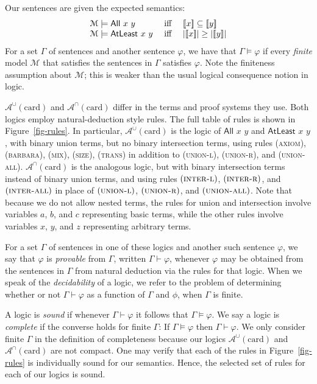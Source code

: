 \documentclass[letterpaper]{article}
\theoremstyle{definition}
\newcommand{\semantics}[1]{[\![\mbox{\em $ #1 $\/}]\!]}
\newcommand{\Model}{\mathcal{M}}
\newcommand{\proves}{\vdash}
\newcommand{\Aunion}{\mathscr{A}^{\cup}}
\newcommand{\Ainter}{\mathscr{A}^{\cap}}
\newcommand{\proverule}{\textsc}
\newcommand{\axiom}{\proverule{axiom}}
\newcommand{\barbara}{\proverule{barbara}}
\newcommand{\unionl}{\proverule{union-l}}
\newcommand{\unionr}{\proverule{union-r}}
\newcommand{\unionall}{\proverule{union-all}}
\newcommand{\interl}{\proverule{inter-l}}
\newcommand{\interr}{\proverule{inter-r}}
\newcommand{\interall}{\proverule{inter-all}}
\newcommand{\mix}{\proverule{mix}}
\newcommand{\size}{\proverule{size}}
\newcommand{\trans}{\proverule{trans}}
\newcommand{\All}[2]{\mathsf{All}\,\,#1\,\,#2}
\newcommand{\Atleast}[2]{\mathsf{AtLeast}\,\,#1\,\,#2}
\newcommand{\card}{\mathrm{card}}
\begin{document}
Our sentences are given the expected semantics:
\[
\begin{array}{lclcl}
    \Model \models \All{x}{y} & \textrm{ iff } & 
        \semantics{x} \subseteq \semantics{y}\\
    \Model \models \Atleast{x}{y} & \textrm{ iff } & 
        |\semantics{x}| \ge |\semantics{y}|
\end{array}
\] 
For a set $\Gamma$ of sentences and another sentence $\varphi$, we have that $\Gamma \vDash \varphi$ if every \textit{finite} model $\mathcal{M}$ that satisfies the sentences in $\Gamma$ satisfies $\varphi$.  Note the finiteness assumption about $\mathcal{M}$; this is weaker than the usual logical consequence notion in logic. 

$\Aunion(\card)$ and $\Ainter(\card)$ differ in the terms and proof systems they use. Both logics employ natural-deduction style rules.  The full table of rules is shown in Figure~\ref{fig-rules}.  In particular, $\Aunion(\card)$ is the logic of $\All{x}{y}$ and $\Atleast{x}{y}$, with binary union terms, but no binary intersection terms, using rules (\axiom), (\barbara), (\mix), (\size), (\trans) in addition to (\unionl), (\unionr), and (\unionall).
$\Ainter(\card)$ is the analogous logic, but with binary intersection terms instead of binary union terms, and using rules $(\interl)$, $(\interr)$, and $(\interall)$ in place of $(\unionl)$, $(\unionr)$, and $(\unionall)$. Note that because we do not allow nested terms, the rules for union and intersection involve variables $a$, $b$, and $c$ representing basic terms, while the other rules involve variables $x$, $y$, and $z$ representing arbitrary terms. 

For a set $\Gamma$ of sentences in one of these logics and another such sentence $\varphi$, we say that $\varphi$ is \emph{provable} from $\Gamma$, written  $\Gamma \proves \varphi$, whenever $\varphi$ may be obtained from the sentences in $\Gamma$ from natural deduction via the rules for that logic.  
When we speak of the \emph{decidability} of a logic, we refer to the problem of determining whether or not $\Gamma \proves \varphi$ as a function of $\Gamma$ and $\phi$, when $\Gamma$ is finite. 

A logic is \emph{sound} if whenever $\Gamma \proves \varphi$ it follows that $\Gamma \models \varphi$.  We say a logic is \emph{complete} if the converse holds for finite $\Gamma$:  If 
$\Gamma \models \varphi$ then $\Gamma \proves \varphi$. We only consider finite $\Gamma$ in the definition of completeness because our logics $\Aunion(\card)$ and $\Ainter(\card)$ are not compact. %
One may verify that each of the rules in Figure~\ref{fig-rules} is individually sound for our semantics.  Hence, the selected set of rules for each of our logics is sound.
\end{document}
